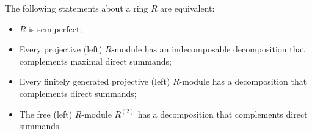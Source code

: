The following statements about a ring $R$ are equivalent:
\begin{itemize}
\item[(a)] $R$ is semiperfect;
\item[(b)] Every projective (left) $R$-module has an indecomposable decomposition that complements maximal direct summands;
\item[(c)] Every finitely generated projective (left) $R$-module has a decomposition that complements direct summands;
\item[(d)] The free (left) $R$-module $R^{(2)}$ has a decomposition that complements direct summands.
\end{itemize}

